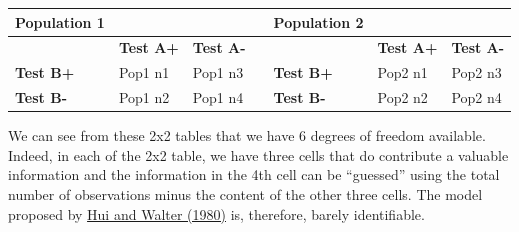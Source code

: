\documentclass[
]{book}
\begin{document}
\begin{longtable}[]{@{}
  >{\centering\arraybackslash}p{}
  >{\centering\arraybackslash}p{}
  >{\centering\arraybackslash}p{}
  >{\centering\arraybackslash}p{}
  >{\centering\arraybackslash}p{}
  >{\centering\arraybackslash}p{}
  >{\centering\arraybackslash}p{}@{}}
\toprule\noalign{}
\begin{minipage}[b]{\linewidth}\centering
\textbf{Population 1}
\end{minipage} & \begin{minipage}[b]{\linewidth}\centering
\end{minipage} & \begin{minipage}[b]{\linewidth}\centering
\end{minipage} & \begin{minipage}[b]{\linewidth}\centering
\end{minipage} & \begin{minipage}[b]{\linewidth}\centering
\textbf{Population 2}
\end{minipage} & \begin{minipage}[b]{\linewidth}\centering
\end{minipage} & \begin{minipage}[b]{\linewidth}\centering
\end{minipage} \\
\midrule\noalign{}
\endhead
\bottomrule\noalign{}
\endlastfoot
& \textbf{Test A+} & \textbf{Test A-} & & & \textbf{Test A+} & \textbf{Test A-} \\
\textbf{Test B+} & Pop1 n1 & Pop1 n3 & & \textbf{Test B+} & Pop2 n1 & Pop2 n3 \\
\textbf{Test B-} & Pop1 n2 & Pop1 n4 & & \textbf{Test B-} & Pop2 n2 & Pop2 n4 \\
\end{longtable}

We can see from these 2x2 tables that we have 6 degrees of freedom available. Indeed, in each of the 2x2 table, we have three cells that do contribute a valuable information and the information in the 4th cell can be ``guessed'' using the total number of observations minus the content of the other three cells. The model proposed by \href{https://www.jstor.org/stable/2530508?seq=1}{Hui and Walter (1980)} is, therefore, barely identifiable.
\end{document}
